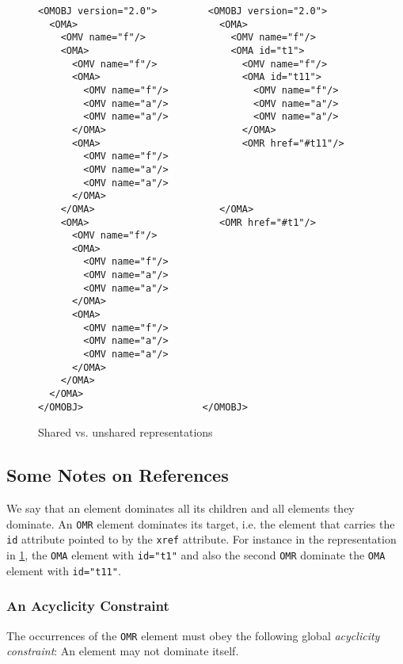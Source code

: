 \begin{figure}\centering
\caption{Shared vs. unshared representations}\label{fig_shared_vs_unshared}
    
\begin{lstlisting}
<OMOBJ version="2.0">         <OMOBJ version="2.0">
  <OMA>                         <OMA>
    <OMV name="f"/>               <OMV name="f"/> 
    <OMA>                         <OMA id="t1">
      <OMV name="f"/>               <OMV name="f"/>
      <OMA>                         <OMA id="t11">
        <OMV name="f"/>               <OMV name="f"/>
        <OMV name="a"/>               <OMV name="a"/>
        <OMV name="a"/>               <OMV name="a"/>
      </OMA>                        </OMA>
      <OMA>                         <OMR href="#t11"/>
        <OMV name="f"/>
        <OMV name="a"/> 
        <OMV name="a"/>
      </OMA>                                
    </OMA>                      </OMA>
    <OMA>                       <OMR href="#t1"/>
      <OMV name="f"/>
      <OMA>
        <OMV name="f"/>
        <OMV name="a"/>
        <OMV name="a"/>
      </OMA>
      <OMA>
        <OMV name="f"/>
        <OMV name="a"/>
        <OMV name="a"/>
      </OMA>
    </OMA>
  </OMA>
</OMOBJ>                     </OMOBJ>
\end{lstlisting}
\end{figure}

\subsection{Some Notes on References}\label{sec_references}

We say that an \OM element dominates all its children and all elements
they dominate. An \lstinline|OMR| element dominates its target,
i.e. the element that carries the \lstinline|id| attribute pointed to
by the \lstinline|xref| attribute. For instance in the representation
in \ref{fig_shared_vs_unshared}, the
\lstinline|OMA| element with \lstinline|id="t1"| and
also the second \lstinline|OMR| dominate the
\lstinline|OMA| element with \lstinline|id="t11"|.

\subsubsection{An Acyclicity Constraint}\label{sec_acyclicity}

The occurrences of the \lstinline|OMR| element must obey the following global
\emph{acyclicity constraint}: An \OM element may not dominate itself.

